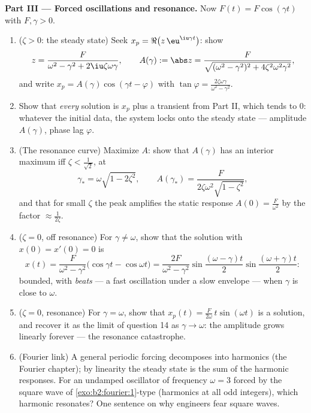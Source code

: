 \begin{problem}
\medskip
\noindent\textbf{Part III --- Forced oscillations and
resonance.} Now $F(t) = F\cos(\gamma t)$ with $F, \gamma > 0$.
\begin{enumerate}[resume]
  \item ($\zeta > 0$: the steady state) Seek $x_p =
        \Re\bigl(z\,\eu^{\iu\gamma t}\bigr)$: show
        \[
        z = \frac{F}{\omega^2 - \gamma^2 +
        2\iu\zeta\omega\gamma},
        \qquad
        A(\gamma) := \abs z = \frac{F}{\sqrt{(\omega^2 -
        \gamma^2)^2 + 4\zeta^2\omega^2\gamma^2}} ,
        \]
        and write $x_p = A(\gamma)\cos(\gamma t - \varphi)$
        with $\tan\varphi =
        \frac{2\zeta\omega\gamma}{\omega^2-\gamma^2}$.
  \item Show that \emph{every} solution is $x_p$ plus a
        transient from Part II, which tends to $0$: whatever
        the initial data, the system locks onto the steady
        state --- amplitude $A(\gamma)$, phase lag
        $\varphi$.
  \item (The resonance curve) Maximize $A$: show that
        $A(\gamma)$ has an interior maximum iff $\zeta <
        \frac{1}{\sqrt2}$, at
        \[
        \gamma_* = \omega\sqrt{1 - 2\zeta^2},
        \qquad
        A(\gamma_*) =
        \frac{F}{2\zeta\omega^2\sqrt{1-\zeta^2}} ,
        \]
        and that for small $\zeta$ the peak amplifies the
        static response $A(0) = \frac F{\omega^2}$ by the
        factor $\approx \frac{1}{2\zeta}$.
  \item ($\zeta = 0$, off resonance) For $\gamma \neq \omega$,
        show that the solution with $x(0) = x'(0) = 0$ is
        \[
        x(t) = \frac{F}{\omega^2 -
        \gamma^2}\bigl(\cos\gamma t - \cos\omega t\bigr)
        = \frac{2F}{\omega^2-\gamma^2}
        \sin\frac{(\omega-\gamma)t}{2}
        \sin\frac{(\omega+\gamma)t}{2} :
        \]
        bounded, with \emph{beats} --- a fast oscillation
        under a slow envelope --- when $\gamma$ is close to
        $\omega$.
  \item ($\zeta = 0$, resonance) For $\gamma = \omega$, show
        that $x_p(t) = \frac{F}{2\omega}\,t\sin(\omega t)$ is
        a solution, and recover it as the limit of question
        14 as $\gamma \to \omega$: the amplitude grows
        linearly forever --- the resonance catastrophe.
  \item (Fourier link) A general periodic forcing decomposes
        into harmonics (the Fourier chapter); by linearity the
        steady state is the sum of the harmonic responses. For
        an undamped oscillator of frequency $\omega = 3$
        forced by the square wave of
        \cref{exo:b2:fourier:1}-type (harmonics at all odd
        integers), which harmonic resonates? One sentence on
        why engineers fear square waves.
\end{enumerate}


\end{problem}
